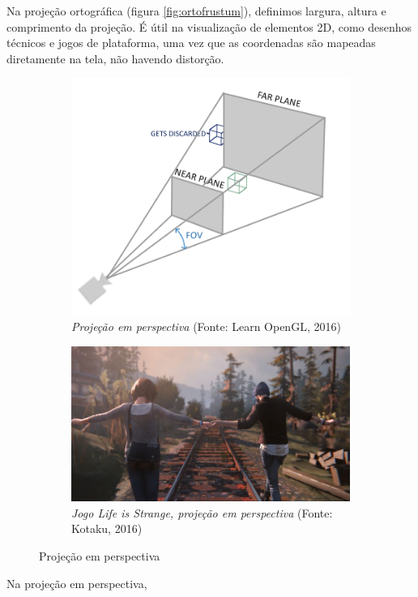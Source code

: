 Na projeção ortográfica (figura \ref{fig:ortofrustum}), definimos largura, altura e comprimento da projeção. É útil na visualização de elementos 2D, como desenhos técnicos e jogos de plataforma, uma vez que as coordenadas são mapeadas diretamente na tela, não havendo distorção.

\begin{figure}[H]
	\begin{subfigure}[b]{0.4\textwidth}
		\includegraphics[width=\textwidth]{imagens/perspective_frustum.png}
		\caption{\textit{Projeção em perspectiva} (Fonte: Learn OpenGL, 2016)}
		\label{fig:perspfrustum}
	\end{subfigure}
	\hfill
	\begin{subfigure}[b]{0.4\textwidth}
		\includegraphics[width=\textwidth]{imagens/life-is-strange.jpg}
		\caption{\textit{Jogo Life is Strange, projeção em perspectiva} (Fonte: Kotaku, 2016)}
		\label{fig:lifeisstrange}
	\end{subfigure}
	\caption{Projeção em perspectiva}
\end{figure}

Na projeção em perspectiva, 